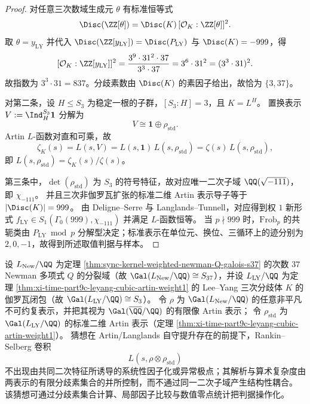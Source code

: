 \begin{proof}
对任意三次数域生成元 \(\theta\) 有标准恒等式
\[
\Disc(\ZZ[\theta])=\Disc(K)\,[\mathcal O_K:\ZZ[\theta]]^2.
\]
取 \(\theta=y_{\mathrm{LY}}\) 并代入
\(
\Disc(\ZZ[y_{\mathrm{LY}}])=\Disc(P_{\mathrm{LY}})
\)
与 \(\Disc(K)=-999\)，得
\[
[\mathcal O_K:\ZZ[y_{\mathrm{LY}}]]^2
=\frac{3^9\cdot 31^2\cdot 37}{3^3\cdot 37}
=3^6\cdot 31^2
=(3^3\cdot 31)^2.
\]
故指数为 \(3^3\cdot 31=837\)。分歧素数由 \(\Disc(K)\) 的素因子给出，故恰为 \(\{3,37\}\)。

对第二条，设 \(H\le S_3\) 为稳定一根的子群，\([S_3:H]=3\)，且 \(K=L^H\)。
置换表示 \(V:=\Ind_H^{S_3}\mathbf 1\) 分解为
\[
V\cong \mathbf 1\oplus \rho_{\mathrm{std}}.
\]
Artin \(L\)-函数对直和可乘，故
\[
\zeta_K(s)=L(s,V)=L(s,\mathbf 1)\,L(s,\rho_{\mathrm{std}})
=\zeta(s)\,L(s,\rho_{\mathrm{std}}),
\]
即
\(
L(s,\rho_{\mathrm{std}})=\zeta_K(s)/\zeta(s)
\)。

第三条中，\(\det(\rho_{\mathrm{std}})\) 为 \(S_3\) 的符号特征，故对应唯一二次子域 \(\QQ(\sqrt{-111})\)，即 \(\chi_{-111}\)。
并且三次非伽罗瓦扩张的标准二维 Artin 表示导子等于 \(|\Disc(K)|=999\)。
由 Deligne--Serre 与 Langlands--Tunnell，对应得到权 \(1\) 新形式
\(
f_{\mathrm{LY}}\in S_1(\Gamma_0(999),\chi_{-111})
\) 并满足 \(L\)-函数恒等。
当 \(p\nmid 999\) 时，\(\mathrm{Frob}_p\) 的共轭类由 \(P_{\mathrm{LY}}\bmod p\) 分解型决定；标准表示在单位元、换位、三循环上的迹分别为 \(2,0,-1\)，故得到所述取值判据与样本。
\end{proof}



\begin{conjecture}\label{conj:xi-newman-leyang-artin-no-cross}
设 \(L_{\mathrm{New}}/\QQ\) 为定理 \ref{thm:sync-kernel-weighted-newman-Q-galois-s37} 的次数 \(37\) Newman 多项式 \(Q\) 的分裂域（故 \(\Gal(L_{\mathrm{New}}/\QQ)\cong S_{37}\)），并设 \(L_{\mathrm{LY}}/\QQ\) 为定理 \ref{thm:xi-time-part9c-leyang-cubic-artin-weight1} 的 Lee--Yang 三次分歧体 \(K\) 的伽罗瓦闭包（故 \(\Gal(L_{\mathrm{LY}}/\QQ)\cong S_3\)）。
令 \(\rho\) 为 \(\Gal(L_{\mathrm{New}}/\QQ)\) 的任意非平凡不可约复表示，并把其视为 \(\Gal(\overline\QQ/\QQ)\) 的有限像 Artin 表示；
令 \(\rho_{\mathrm{std}}\) 为 \(\Gal(L_{\mathrm{LY}}/\QQ)\) 的标准二维 Artin 表示（定理 \ref{thm:xi-time-part9c-leyang-cubic-artin-weight1}）。
猜想在 Artin/Langlands 自守提升存在的前提下，Rankin--Selberg 卷积
\[
L(s,\rho\otimes\rho_{\mathrm{std}})
\]
不出现由共同二次特征所诱导的系统性因子化或异常极点；其解析与算术复杂度由两表示的有限分歧素集合的并所控制，而不通过同一二次子域产生结构性耦合。
该猜想可通过分歧素集合计算、局部因子比较与数值零点统计把判据操作化。
\end{conjecture}

